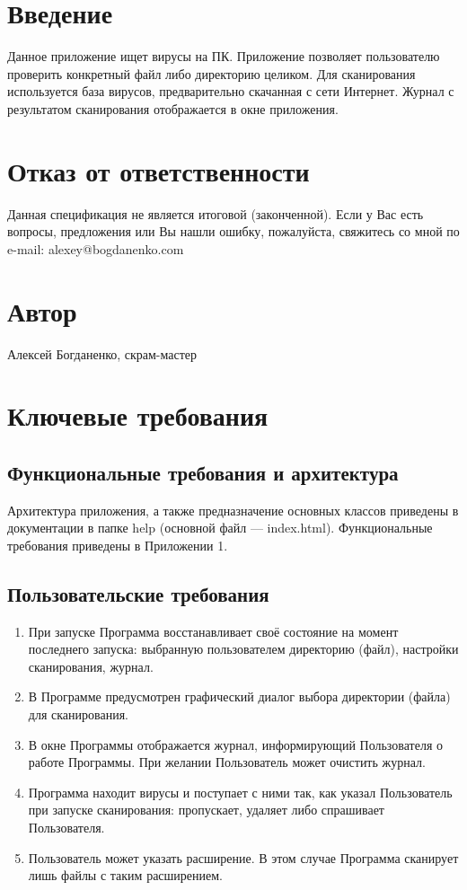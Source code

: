 \section{Введение}
Данное приложение ищет вирусы на ПК. Приложение позволяет пользователю проверить конкретный файл либо директорию целиком. Для сканирования используется база вирусов, предварительно скачанная с сети Интернет. Журнал с результатом сканирования отображается в окне приложения.
\section{Отказ от ответственности}
Данная спецификация не является итоговой (законченной). Если у Вас есть вопросы, предложения или Вы нашли ошибку, пожалуйста, свяжитесь со мной по e-mail: alexey@bogdanenko.com
\section{Автор}
Алексей Богданенко, скрам-мастер
\section{Ключевые требования}
\subsection{Функциональные требования и архитектура}
Архитектура приложения, а также предназначение основных классов приведены в документации в папке help (основной файл — index.html). Функциональные требования приведены в Приложении 1.
\subsection{Пользовательские требования}
\begin{enumerate}
\item При запуске Программа восстанавливает своё состояние на момент последнего запуска: выбранную пользователем директорию (файл), настройки сканирования, журнал.
\item В Программе предусмотрен графический диалог выбора директории (файла) для сканирования.
\item В окне Программы отображается журнал, информирующий Пользователя о работе Программы. При желании Пользователь может очистить журнал.
\item Программа находит вирусы и поступает с ними так, как указал Пользователь при запуске сканирования: пропускает, удаляет либо спрашивает Пользователя.
\item Пользователь может указать расширение. В этом случае Программа сканирует лишь файлы с таким расширением.
\end{enumerate}
